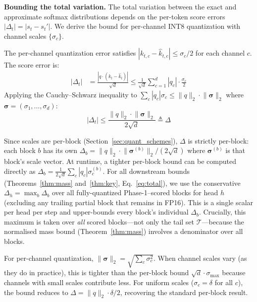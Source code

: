 \documentclass[10pt,twocolumn,a4paper]{article}
\theoremstyle{definition}
\theoremstyle{remark}
\newcommand{\norm}[1]{\lVert #1 \rVert}
\begin{document}
\textbf{Bounding the total variation.}  The total variation between the exact and approximate softmax distributions depends on the per-token score errors $|\Delta_t| = |s_t - s_t'|$.  We derive the bound for per-channel INT8 quantization with channel scales $\{\sigma_c\}$.

The per-channel quantization error satisfies $|k_{t,c} - \hat{k}_{t,c}| \leq \sigma_c / 2$ for each channel $c$.  The score error is:
\begin{align*}
  |\Delta_t| &= \frac{|q \cdot (k_t - \hat{k}_t)|}{\sqrt{d}} \leq \frac{1}{\sqrt{d}} \sum_{c=1}^d |q_c| \cdot \frac{\sigma_c}{2}
\end{align*}
Applying the Cauchy--Schwarz inequality to $\sum_c |q_c| \sigma_c \leq \norm{q}_2 \cdot \norm{\boldsymbol{\sigma}}_2$ where $\boldsymbol{\sigma} = (\sigma_1, \ldots, \sigma_d)$:
\begin{equation}
\label{eq:delta}
  |\Delta_t| \leq \frac{\norm{q}_2 \cdot \norm{\boldsymbol{\sigma}}_2}{2\sqrt{d}} \triangleq \Delta
\end{equation}

Since scales are per-block (Section~\ref{sec:quant_schemes}), $\Delta$ is strictly per-block: each block $b$ has its own $\Delta_b = \norm{q}_2 \cdot \norm{\boldsymbol{\sigma}^{(b)}}_2 / (2\sqrt{d})$ where $\boldsymbol{\sigma}^{(b)}$ is that block's scale vector.  At runtime, a tighter per-block bound can be computed directly as $\Delta_b = \frac{1}{2\sqrt{d}} \sum_c |q_c| \sigma_c^{(b)}$.  For all downstream bounds (Theorems~\ref{thm:mass} and~\ref{thm:key}, Eq.~\ref{eq:total}), we use the conservative $\Delta_h = \max_{b} \Delta_b$ over all fully-quantized Phase-1--scored blocks for head $h$ (excluding any trailing partial block that remains in FP16).  This is a single scalar per head per step and upper-bounds every block's individual $\Delta_b$.  Crucially, this maximum is taken over \emph{all} scored blocks---not only the tail set $\mathcal{T}$---because the normalised mass bound (Theorem~\ref{thm:mass}) involves a denominator over all blocks.

For per-channel quantization, $\norm{\boldsymbol{\sigma}}_2 = \sqrt{\sum_c \sigma_c^2}$.  When channel scales vary (as they do in practice), this is tighter than the per-block bound $\sqrt{d} \cdot \sigma_{\max}$ because channels with small scales contribute less.  For uniform scales ($\sigma_c = \delta$ for all $c$), the bound reduces to $\Delta = \norm{q}_2 \cdot \delta / 2$, recovering the standard per-block result.
\end{document}
